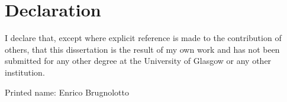 \chapter{Declaration}

I declare that, except where explicit reference is made to the contribution of others, that this dissertation is the result of my own work and has not been submitted for any other degree at the University of Glasgow or any other institution.

Printed name: Enrico Brugnolotto
